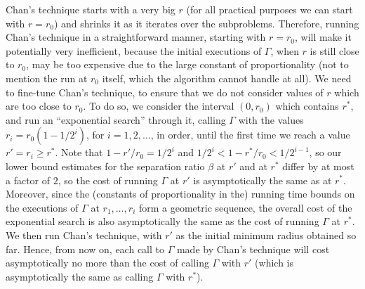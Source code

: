 \documentclass[a4paper,12pt]{article}
\begin{document}
Chan's technique starts with a very big $r$ (for all practical
purposes we can start with $r = r_0$) and shrinks it as it iterates
over the subproblems. Therefore, running Chan's technique in a
straightforward manner, starting with $r = r_0$, will make it
potentially very inefficient, because the initial executions of
$\Gamma$, when $r$ is still close to $r_0$, may be too expensive due
to the large constant of proportionality (not to mention the run at
$r_0$ itself, which the algorithm cannot handle at all). We need to
fine-tune Chan's technique, to ensure that we do not consider values
of $r$ which are too close to $r_0$. To do so, we consider the
interval $(0, r_0)$ which contains $r^*$, and run an ``exponential
search'' through it, calling $\Gamma$ with the values $r_i = r_0
\left(1-1/2^i\right)$, for $i = 1,2, \ldots$, in order, until the
first time we reach a value $r' = r_i \geq r^*$. Note that $1-
r'/r_0 = 1/2^i$ and $1/2^i < 1- r^*/r_0 < 1/2^{i-1}$, so our lower
bound estimates for the separation ratio $\beta$ at $r'$ and at
$r^*$ differ by at most a factor of $2$, so the cost of running
$\Gamma$ at $r'$ is asymptotically the same as at $r^*$. Moreover,
since the (constants of proportionality in the) running time bounds
on the executions of $\Gamma$ at $r_1,\ldots,r_i$ form a geometric
sequence, the overall cost of the exponential search is also
asymptotically the same as the cost of running $\Gamma$ at $r^*$. We
then run Chan's technique, with $r'$ as the initial minimum radius
obtained so far. Hence, from now on, each call to $\Gamma$ made by
Chan's technique will cost asymptotically no more than the cost of
calling $\Gamma$ with $r'$ (which is asymptotically the same as
calling $\Gamma$ with $r^*$).
\end{document}
